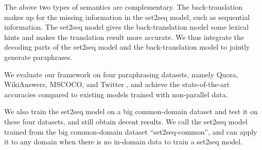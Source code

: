 The above two types of semantics are complementary. The back-translation makes 
up for the missing information in the set2seq model, such as sequential information. The set2seq model gives the back-translation model some lexical hints 
and makes the translation result more accurate. We thus integrate the decoding parts of 
the set2seq model and the back-translation model to jointly generate paraphrases.

We evaluate our framework on four paraphrasing datasets, namely Quora, WikiAnswers, MSCOCO, and Twitter \cite{lan2017continuously}, and achieve the state-of-the-art accuracies compared to existing models trained with non-parallel data. 


We also train the set2seq model on a big common-domain dataset and test it on these four datasets, and still obtain decent results. We call the set2seq model trained from the big common-domain dataset ``set2seq-common'', and can
apply it to any domain when there is no in-domain data to train a set2seq model.


